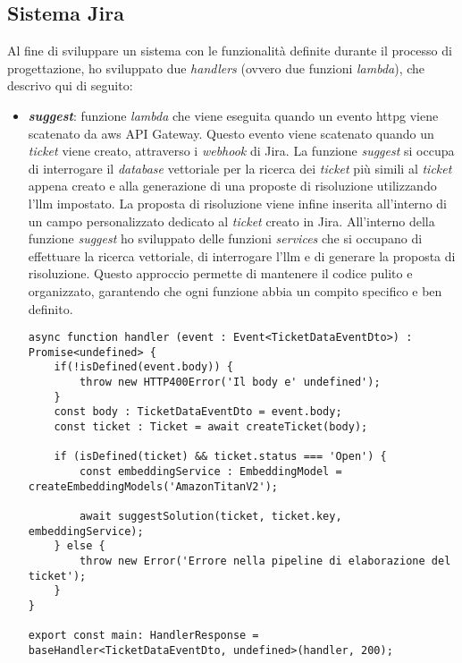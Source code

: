 \subsection{Sistema Jira}
Al fine di sviluppare un sistema con le funzionalità definite durante il processo di progettazione, ho sviluppato due \textit{handlers} (ovvero due funzioni \textit{lambda}), che descrivo qui di seguito:
\begin{itemize}
    \item \textbf{\textit{suggest}}: funzione \textit{lambda} che viene eseguita quando un evento \gls{httpg} viene scatenato da \gls{aws} API Gateway. Questo evento viene scatenato quando un \textit{ticket} viene creato, attraverso i \textit{webhook} di Jira. La funzione \textit{suggest} si occupa di interrogare il \textit{database} vettoriale per la ricerca dei \textit{ticket} più simili al \textit{ticket} appena creato e alla generazione di una proposte di risoluzione utilizzando l'\gls{llm} impostato. La proposta di risoluzione viene infine inserita all'interno di un campo personalizzato dedicato al \textit{ticket} creato in Jira.
    All'interno della funzione \textit{suggest} ho sviluppato delle funzioni \textit{services} che si occupano di effettuare la ricerca vettoriale, di interrogare l'\gls{llm} e di generare la proposta di risoluzione. Questo approccio permette di mantenere il codice pulito e organizzato, garantendo che ogni funzione abbia un compito specifico e ben definito.
    \begin{lstlisting}[caption=Funzione \textit{lambda suggest}, label=lst:suggestLambda]
async function handler (event : Event<TicketDataEventDto>) : Promise<undefined> {
    if(!isDefined(event.body)) {
        throw new HTTP400Error('Il body e' undefined');
    }
    const body : TicketDataEventDto = event.body;
    const ticket : Ticket = await createTicket(body);
          
    if (isDefined(ticket) && ticket.status === 'Open') {
        const embeddingService : EmbeddingModel = createEmbeddingModels('AmazonTitanV2');
          
        await suggestSolution(ticket, ticket.key, embeddingService);
    } else {
        throw new Error('Errore nella pipeline di elaborazione del ticket');
    }
}

export const main: HandlerResponse = baseHandler<TicketDataEventDto, undefined>(handler, 200);\end{lstlisting}
    


\end{itemize}
